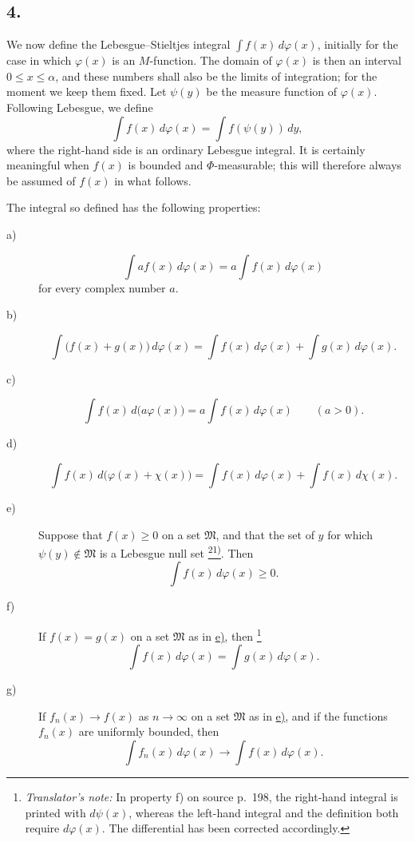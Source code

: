 \documentclass[12pt,b5paper,twoside]{article}
\newcommand{\noteref}[1]{%
  \hyperlink{note:#1}{\textsuperscript{#1)}}}
\newcommand{\translatorfootnote}[2]{%
  \begingroup
  \renewcommand{\thefootnote}{#1}%
  \footnote{\hspace{0.8em}\textit{Translator's note:} #2}%
  \endgroup}
\begin{document}
\subsection*{4.}
\label{sec:I.4}
We now define the Lebesgue--Stieltjes integral $\int f(x)\,d\varphi(x)$, initially for the case in which $\varphi(x)$ is an $M$-function. The domain of $\varphi(x)$ is then an interval $0\leq x\leq\alpha$, and these numbers shall also be the limits of integration; for the moment we keep them fixed. Let $\psi(y)$ be the measure function of $\varphi(x)$. Following Lebesgue, we define
\label{eq:LS-definition-finite}
\begin{equation*}
 \int f(x)\,d\varphi(x)=\int f(\psi(y))\,dy,
\end{equation*}
where the right-hand side is an ordinary Lebesgue integral. It is certainly meaningful when $f(x)$ is bounded and $\Phi$-measurable; this will therefore always be assumed of $f(x)$ in what follows.

The integral so defined has the following properties:
\begin{description}
 \item[\textup{a)}]\label{prop:I.4.a}
 \[
  \int af(x)\,d\varphi(x)=a\int f(x)\,d\varphi(x)
 \]
 for every complex number $a$.

 \item[\textup{b)}]\label{prop:I.4.b}
 \[
  \int \bigl(f(x)+g(x)\bigr)\,d\varphi(x)
  =\int f(x)\,d\varphi(x)+\int g(x)\,d\varphi(x).
 \]

 \item[\textup{c)}]\label{prop:I.4.c}
 \[
  \int f(x)\,d\bigl(a\varphi(x)\bigr)
  =a\int f(x)\,d\varphi(x)\qquad(a>0).
 \]

 \item[\textup{d)}]\label{prop:I.4.d}
 \[
  \int f(x)\,d\bigl(\varphi(x)+\chi(x)\bigr)
  =\int f(x)\,d\varphi(x)+\int f(x)\,d\chi(x).
 \]

 \item[\textup{e)}]\label{prop:I.4.e}
 Suppose that $f(x)\geq0$ on a set $\mathfrak M$, and that the set of $y$ for which $\psi(y)\notin\mathfrak M$ is a Lebesgue null set\noteref{21}. Then
 \[
  \int f(x)\,d\varphi(x)\geq0.
 \]

 \item[\textup{f)}]\label{prop:I.4.f}
 If $f(x)=g(x)$ on a set $\mathfrak M$ as in \hyperref[prop:I.4.e]{e)},
 then\translatorfootnote{T1}{In property f) on source p.~198, the right-hand integral
 is printed with $d\psi(x)$, whereas the left-hand integral and the definition both
 require $d\varphi(x)$.  The differential has been corrected accordingly.}
 \[
  \int f(x)\,d\varphi(x)=\int g(x)\,d\varphi(x).
 \]

 \item[\textup{g)}]\label{prop:I.4.g}
 If $f_n(x)\to f(x)$ as $n\to\infty$ on a set $\mathfrak M$ as in \hyperref[prop:I.4.e]{e)}, and if the functions $f_n(x)$ are uniformly bounded, then
 \[
  \int f_n(x)\,d\varphi(x)\longrightarrow\int f(x)\,d\varphi(x).
 \]
\end{description}
\end{document}
